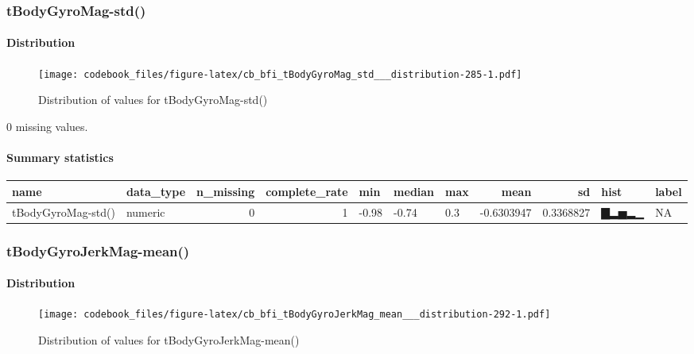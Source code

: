 \documentclass[
]{article}
\begin{document}
\hypertarget{tBodyGyroMag_std__}{%
\subsubsection{tBodyGyroMag-std()}\label{tBodyGyroMag_std__}}

\hypertarget{tBodyGyroMag_std___distribution}{%
\paragraph{Distribution}\label{tBodyGyroMag_std___distribution}}

\begin{figure}
\centering
\texttt{[image: codebook\_files/figure-latex/cb\_bfi\_tBodyGyroMag\_std\_\_\_distribution-285-1.pdf]}
\caption{Distribution of values for tBodyGyroMag-std()}
\end{figure}

0 missing values.

\hypertarget{tBodyGyroMag_std___summary}{%
\paragraph{Summary statistics}\label{tBodyGyroMag_std___summary}}

\begin{longtable}[]{@{}llrrlllrrll@{}}
\toprule
name & data\_type & n\_missing & complete\_rate & min & median & max &
mean & sd & hist & label \\
\midrule
\endhead
tBodyGyroMag-std() & numeric & 0 & 1 & -0.98 & -0.74 & 0.3 & -0.6303947
& 0.3368827 & ▇▂▅▂▁ & NA \\
\bottomrule
\end{longtable}

\hypertarget{tBodyGyroJerkMag_mean__}{%
\subsubsection{tBodyGyroJerkMag-mean()}\label{tBodyGyroJerkMag_mean__}}

\hypertarget{tBodyGyroJerkMag_mean___distribution}{%
\paragraph{Distribution}\label{tBodyGyroJerkMag_mean___distribution}}

\begin{figure}
\centering
\texttt{[image: codebook\_files/figure-latex/cb\_bfi\_tBodyGyroJerkMag\_mean\_\_\_distribution-292-1.pdf]}
\caption{Distribution of values for tBodyGyroJerkMag-mean()}
\end{figure}
\end{document}
